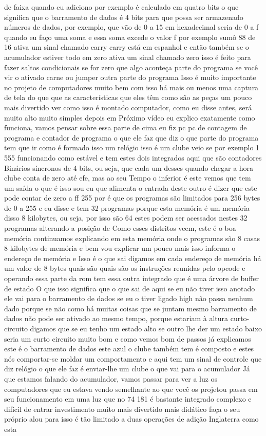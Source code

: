 \documentclass[oneside,11pt]{memoir} %
\begin{document}
de faixa quando eu adiciono por  exemplo é calculado em quatro bits  o que significa que o barramento de dados é  4 bits para que possa ser armazenado  números de dados, por exemplo, que vão de 0  a 15 em hexadecimal seria de 0 a f  quando eu faço uma soma e essa soma  excede o valor f  por exemplo sumô 88 de 16 ativa um  sinal chamado carry  carry está em espanhol e então  também se o acumulador estiver todo em  zero ativa um sinal chamado  zero isso é feito para fazer saltos  condicionais se for zero que algo aconteça  parte do programa se você vir o ativado  carne ou jumper outra parte do programa  Isso é muito importante no projeto  de computadores muito bem com isso  há mais ou menos uma captura de tela do que  que as características que eles têm  como são as peças um pouco mais  divertido ver como isso é montado  computador, como eu disse antes, será  muito alto muito simples depois em  Próximo vídeo eu explico  exatamente como funciona, vamos pensar sobre  essa parte de cima eu fiz pc pc de  contagem de programa e contador de programa  o que ele faz que diz o que  parte do programa tem que ir como  é formado isso um relógio isso é um  clube veio se por exemplo 1 555  funcionando como estável e tem estes  dois integrados aqui que são contadores  Binários síncronos de 4 bits, ou seja,  que cada um desses quando chegar a hora  clube conta de zero até efe, mas ao seu  Tempo  o inferior é este vemos que tem um  saída  o que é isso sou eu que alimenta o  entrada deste outro é dizer que este  pode contar de zero a ff 255 por  é que os programas são limitados  para 256 bytes de 0 a 255 e eu disse e tem  32 programas porque esta memória é um  memória disso  8 kilobytes, ou seja, por isso são 64  estes podem ser acessados nestes 32  programas alterando a posição de  Como esses distritos veem, este é o  boa memória continuamos explicando em  esta memória onde o  programas são 8 casas 8 kilobytes de  memória  e bem vou explicar um pouco mais  isso informa o endereço de memória e  Isso é o que sai digamos em cada  endereço de memória há um valor de 8  bytes quais são quais são os  instruções reunidas pelo  opcode e operando  essa parte da rom tem essa outra  integrado que é uma árvore de buffer de estado  O que isso significa que o que sai de  aqui se eu não tiver isso anotado  ele vai para o barramento de dados se eu o tiver ligado  high não passa nenhum dado porque se não  como há muitas coisas que se juntam  mesmo barramento de dados não pode ser ativado  ao mesmo tempo, porque estariam à altura  curto-circuito digamos que se eu tenho um estado  alto se outro lhe der um estado baixo seria  um curto circuito  muito bom e como vemos  bom de passos já explicamos este é o  barramento de dados este azul o clube também  tem é composto e estes nós  comportar-se moldar um comportamento e aqui  tem um sinal de controle que diz  relógio  o que ele faz é enviar-lhe um clube  o que vai para o acumulador  Já que estamos falando do acumulador, vamos passar para  ver a luz os computadores que eu estava  vendo semelhante ao que você os projetou  passa em seu funcionamento em uma luz que  no 74 181 é bastante integrado  complexo e difícil de entrar  investimento muito mais divertido mais  didático faça o seu próprio alou para isso  é tão limitado a duas operações de adição  Inglaterra como esta 
\end{document}
